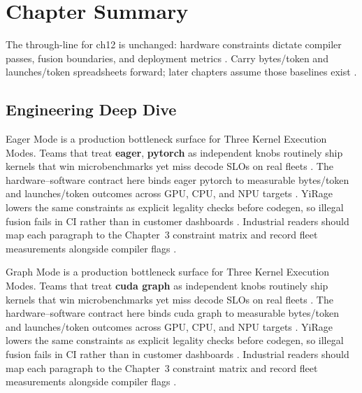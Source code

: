 \section{Chapter Summary}
\label{sec:ch12_summary}

The through-line for ch12 is unchanged: hardware constraints dictate compiler passes, fusion boundaries, and deployment metrics \citep{memoryfloor2026,amd2024xdna}. Carry bytes/token and launches/token spreadsheets forward; later chapters assume those baselines exist \citep{semianalysis2024tma,dlbook}.


\subsection{Engineering Deep Dive}
\label{sec:ch12_deep_dive}

Eager Mode is a production bottleneck surface for Three Kernel Execution Modes. Teams that treat \textbf{eager}, \textbf{pytorch} as independent knobs routinely ship kernels that win microbenchmarks yet miss decode SLOs on real fleets \citep{semianalysis2024tma,dlbook}. The hardware--software contract here binds eager pytorch to measurable bytes/token and launches/token outcomes across GPU, CPU, and NPU targets \citep{amd2024xdna,dao2022flashattention}. YiRage lowers the same constraints as explicit legality checks before codegen, so illegal fusion fails in CI rather than in customer dashboards \citep{amd2024aie,kwon2023vllm}. Industrial readers should map each paragraph to the Chapter~3 constraint matrix and record fleet measurements alongside compiler flags \citep{dlbook,nvidia2024cudagraphs}.

Graph Mode is a production bottleneck surface for Three Kernel Execution Modes. Teams that treat \textbf{cuda graph} as independent knobs routinely ship kernels that win microbenchmarks yet miss decode SLOs on real fleets \citep{amd2024xdna,dao2022flashattention}. The hardware--software contract here binds cuda graph to measurable bytes/token and launches/token outcomes across GPU, CPU, and NPU targets \citep{amd2024aie,kwon2023vllm}. YiRage lowers the same constraints as explicit legality checks before codegen, so illegal fusion fails in CI rather than in customer dashboards \citep{dlbook,nvidia2024cudagraphs}. Industrial readers should map each paragraph to the Chapter~3 constraint matrix and record fleet measurements alongside compiler flags \citep{dao2022flashattention,liu2024deepseekv3}.


